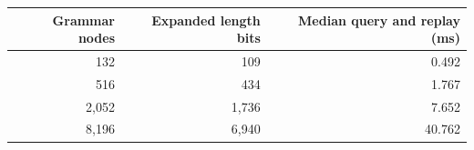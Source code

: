 \begin{tabular}{rrr}
\toprule
Grammar nodes & Expanded length bits & Median query and replay (ms) \\
\midrule
132 & 109 & 0.492\\
516 & 434 & 1.767\\
2,052 & 1,736 & 7.652\\
8,196 & 6,940 & 40.762\\
\bottomrule
\end{tabular}
